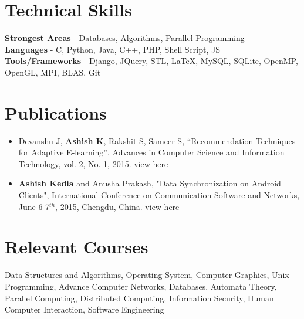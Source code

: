 \documentclass[margin, centered]{res}
\begin{document}
\begin{resume}
\section{Technical \hspace{2mm} Skills}
\textbf{Strongest Areas} - Databases, Algorithms, Parallel Programming \\
\textbf{Languages} - C, Python, Java, C++, PHP, Shell Script, JS\\
\textbf{Tools/Frameworks} - Django, JQuery, STL, \LaTeX, MySQL, SQLite, OpenMP, OpenGL, MPI, BLAS, Git


\section{Publications}
\begin{itemize}[leftmargin=*]
\item Devanshu J, \textbf{Ashish K}, Rakshit S, Sameer S, ``Recommendation Techniques for Adaptive E-learning'', Advances in Computer Science and Information Technology, vol. 2, No. 1, 2015. \href{https://drive.google.com/file/d/0B6A-3_6rwie9bS1OaFdzbW9BZXM/view?usp=sharing}{view here}
\item \textbf{Ashish Kedia} and Anusha Prakash, "Data Synchronization on Android Clients", International Conference on Communication Software and Networks, June 6-7$^{th}$, 2015, Chengdu, China. \href{http://ieeexplore.ieee.org/xpl/articleDetails.jsp?reload=true&arnumber=7296156}{view here}
\end{itemize}

\section{Relevant \hspace{2mm} Courses}
Data Structures and Algorithms, Operating System, Computer Graphics, Unix Programming, Advance Computer Networks, Databases, Automata Theory, Parallel Computing, Distributed Computing, Information Security, Human Computer Interaction, Software Engineering


\end{resume}
\end{document}
